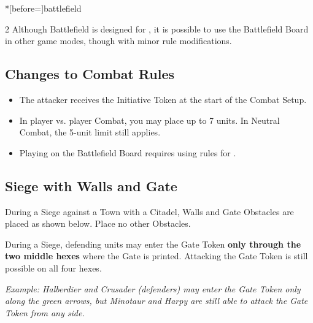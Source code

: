 \begin{expansion}*[before=\vspace*{-11mm}]{battlefield}
  \begin{multicols*}{2}
    Although Battlefield is designed for , it is possible to use the Battlefield Board in other game modes, though with minor rule modifications.

    \subsection*{Changes to Combat Rules}

    \begin{itemize}
      \item The attacker receives the Initiative Token at the start of the Combat Setup.
      \item In player vs. player Combat, you may place up to 7 units.
        In Neutral Combat, the 5-unit limit still applies.
      \item Playing on the Battlefield Board requires using rules for .
    \end{itemize}

    \subsection*{Siege with Walls and Gate}
    During a Siege against a Town with a Citadel, Walls and Gate Obstacles are placed as shown below.
    Place no other Obstacles.\par
    \bigskip
    \columnbreak

    During a Siege, defending units may enter the Gate Token \textbf{only through the two middle hexes} where the Gate is printed.
    Attacking the Gate Token is still possible on all four hexes.\par
    \bigskip
    \textit{\footnotesize{}Example: Halberdier and Crusader (defenders) may enter the Gate Token only along the green arrows, but Minotaur and Harpy are still able to attack the Gate Token from any side.}


\end{multicols*}
\end{expansion}
